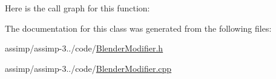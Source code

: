 Here is the call graph for this function\+:




The documentation for this class was generated from the following files\+:\begin{DoxyCompactItemize}
\item 
assimp/assimp-\/3../code/\hyperlink{_blender_modifier_8h}{Blender\+Modifier.\+h}\item 
assimp/assimp-\/3../code/\hyperlink{_blender_modifier_8cpp}{Blender\+Modifier.\+cpp}\end{DoxyCompactItemize}

